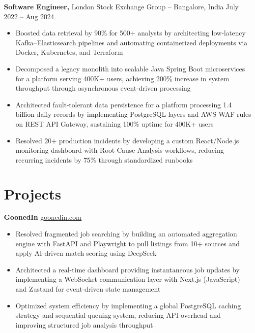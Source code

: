 \documentclass[11pt]{article}
\begin{document}
\textbf{Software Engineer,} {London Stock Exchange Group} -- Bangalore, India \hfill July 2022 -- Aug 2024 \\
\vspace{-9pt}
\begin{itemize}
    \item Boosted data retrieval by 90\% for 500+ analysts by architecting low-latency Kafka--Elasticsearch pipelines and automating containerized deployments via Docker, Kubernetes, and Terraform
    \item Decomposed a legacy monolith into scalable Java Spring Boot microservices for a platform serving 400K+ users, achieving 200\% increase in system throughput through asynchronous event-driven processing
    \item Architected fault-tolerant data persistence for a platform processing 1.4 billion daily records by implementing PostgreSQL layers and AWS WAF rules on REST API Gateway, sustaining 100\% uptime for 400K+ users
    \item Resolved 20+ production incidents by developing a custom React/Node.js monitoring dashboard with Root Cause Analysis workflows, reducing recurring incidents by 75\% through standardized runbooks
\end{itemize}

\vspace{-18.5pt}

\section*{Projects}
\textbf{GoonedIn} \hfill \href{https://goonedin.vercel.app/}{goonedin.com} \\
\vspace{-9pt}
\begin{itemize}
    \item Resolved fragmented job searching by building an automated aggregation engine with FastAPI and Playwright to pull listings from 10+ sources and apply AI-driven match scoring using DeepSeek
    \item Architected a real-time dashboard providing instantaneous job updates by implementing a WebSocket communication layer with Next.js (JavaScript) and Zustand for event-driven state management
    \item Optimized system efficiency by implementing a global PostgreSQL caching strategy and sequential queuing system, reducing API overhead and improving structured job analysis throughput
\end{itemize}
\end{document}
